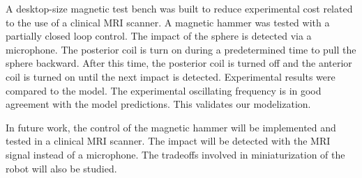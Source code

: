 \documentclass[letterpaper, 10 pt, conference]{ieeeconf}  %
\begin{document}
A desktop-size magnetic test bench was built to reduce experimental cost related to the use of a clinical MRI scanner. 
A magnetic hammer was tested with a partially closed loop control. 
The impact of the sphere is detected via a microphone. 
The posterior coil is turn on during a predetermined time to pull the sphere backward.
 After this time, the posterior coil is turned off and the anterior coil is turned on until the next impact is detected. 
 Experimental results were compared to the model.
  The experimental oscillating frequency is in good agreement with the model predictions. 
  This validates our modelization.\par
In future work, the control of the magnetic hammer will be implemented and tested in a clinical MRI scanner. 
The impact will be detected with the MRI signal instead of a microphone. 
The tradeoffs involved in miniaturization of the robot will also be studied.

 

\addtolength{\textheight}{-12cm}   %







\end{document}
